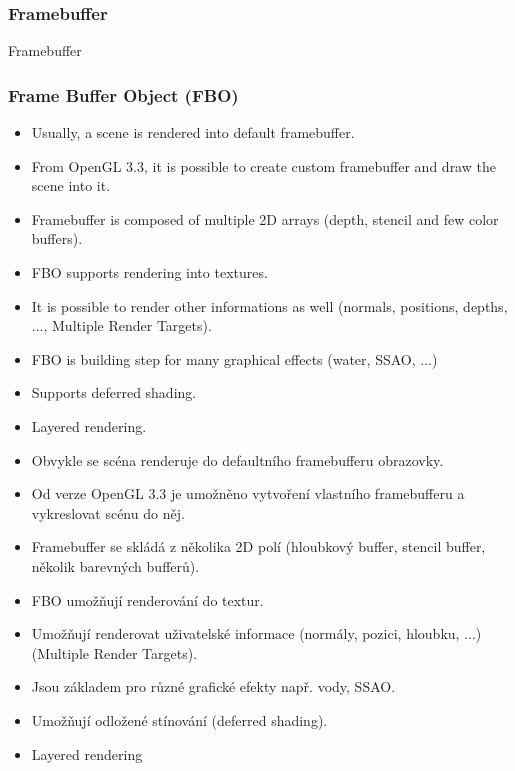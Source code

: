 \begin{frame}
\frametitle{Framebuffer}
\begin{center}
\Huge {\color{white}Framebuffer}
\end{center}
\end{frame}

\begin{frame}[fragile]\frametitle{Frame Buffer Object (FBO)}\scriptsize
  \begin{itemize}
    \item Usually, a scene is rendered into default framebuffer.
    \item From OpenGL 3.3, it is possible to create custom framebuffer and draw the scene into it.
    \item Framebuffer is composed of multiple 2D arrays (depth, stencil and few color buffers).
    \item FBO supports rendering into textures.
    \item It is possible to render other informations as well (normals, positions, depths, ..., Multiple Render Targets).
    \item FBO is building step for many graphical effects (water, SSAO, ...)
    \item Supports deferred shading.
    \item Layered rendering.
  \end{itemize}

  \begin{itemize}
    \item Obvykle se scéna renderuje do defaultního framebufferu obrazovky.
    \item Od verze OpenGL 3.3 je umožněno vytvoření vlastního framebufferu a vykreslovat scénu do něj.
    \item Framebuffer se skládá z několika 2D polí (hloubkový buffer, stencil buffer, několik barevných bufferů).
    \item{FBO umožňují renderování do textur.}
    \item{Umožňují renderovat uživatelské informace (normály, pozici, hloubku, ...) (Multiple Render Targets).}
    \item{Jsou základem pro různé grafické efekty např. vody, SSAO.}
    \item{Umožňují odložené stínování (deferred shading).}
    \item{Layered rendering}
  \end{itemize}
\end{frame}

